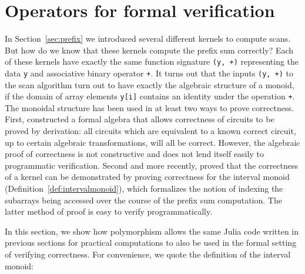 \documentclass{sig-alternate}
\newcommand{\code}[1]{\texttt{#1}}
\begin{document}
\section{Operators for formal verification}

In Section~\ref{sec:prefix} we introduced several different kernels to compute
scans. But how do we know that these kernels compute the prefix sum correctly?
Each of these kernels have exactly the same function signature \code{(y,
+)} representing the data \code{y} and associative binary operator \code{+}.
It turns out that the inputs \code{(y, +)} to the scan algorithm turn out to
have exactly the algebraic structure of a monoid, if the domain of array
elements \code{y[i]} contains an identity under the operation \code{+}. The
monoidal structure has been used in at least two ways to prove correctness.
First, \cite{Hinze2004} constructed a formal algebra that allows correctness of
circuits to be proved by derivation: all circuits which are equivalent to a
known correct circuit, up to certain algebraic transformations, will all be
correct. However, the algebraic proof of correctness is not constructive and
does not lend itself easily to programmatic verification. Second and more
recently, \cite{Chong2014} proved that the correctness of a kernel can be
demonstrated by proving correctness for the interval monoid
(Definition~\ref{def:intervalmonoid}), which formalizes the notion of indexing
the subarrays being accessed over the course of the prefix sum computation. The
latter method of proof is easy to verify programmatically.

In this section, we show how polymorphism allows the same Julia code written in
previous sections for practical computations to also be used in the formal
setting of verifying correctness. For convenience, we quote the definition of
the interval monoid:
\end{document}
